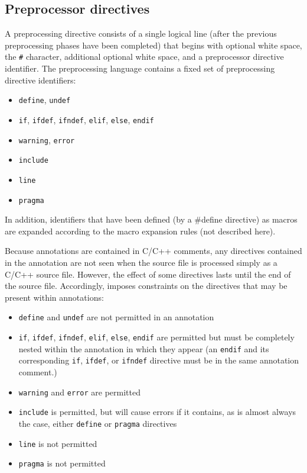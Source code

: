 \subsection{Preprocessor directives}
A preprocessing directive consists of a single logical line (after the previous preprocessing phases have been completed) that begins with optional white space, the \verb|#| character, additional optional white space, and a preprocessor directive identifier.
The preprocessing language contains a fixed set of preprocessing directive identifiers:
\begin{itemize}
	\item \texttt{define}, \texttt{undef}
	\item \texttt{if}, \texttt{ifdef}, \texttt{ifndef}, \texttt{elif}, \texttt{else}, \texttt{endif}
	\item \texttt{warning}, \texttt{error}
	\item \texttt{include}
	\item \texttt{line}
	\item \texttt{pragma}
\end{itemize}
In addition, identifiers that have been defined (by a \#define directive) as macros are expanded according to the macro expansion rules (not described here).

Because \acslb annotations are contained in C/C++ comments,
any directives contained in the annotation are not seen when the source file is processed simply as a C/C++ source file. However, the effect of some directives lasts until the end of the source file. 
Accordingly, \acslpp imposes constraints on the directives that may be present within annotations:
\begin{itemize}
	\item \texttt{define} and \texttt{undef} are not permitted in an annotation
	\item \texttt{if}, \texttt{ifdef}, \texttt{ifndef}, \texttt{elif}, \texttt{else}, \texttt{endif} are permitted but must be completely nested within the annotation in which they appear (an \texttt{endif} and its corresponding \texttt{if}, \texttt{ifdef}, or \texttt{ifndef} directive must be in the same annotation comment.)
	\item \texttt{warning} and \texttt{error} are permitted
	\item \texttt{include} is permitted, but will cause errors if it contains, as is almost always the case, either \texttt{define} or \texttt{pragma} directives
	\item \texttt{line} is not permitted
	\item \texttt{pragma} is not permitted
\end{itemize}

